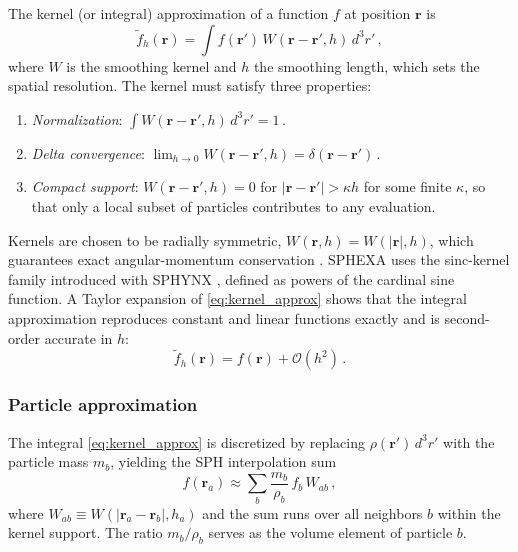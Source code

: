 The kernel (or integral) approximation of a function $f$ at position $\mathbf{r}$ is \cite{Rosswog2009}
\begin{equation}
    \tilde{f}_h(\mathbf{r}) = \int f(\mathbf{r}') \, W(\mathbf{r} - \mathbf{r}', h) \, d^3 r'\,,
    \label{eq:kernel_approx}
\end{equation}
where $W$ is the smoothing kernel and $h$ the smoothing length, which sets the spatial resolution. The kernel must satisfy three properties:
\begin{enumerate}
    \item \emph{Normalization}: $\int W(\mathbf{r} - \mathbf{r}', h) \, d^3 r' = 1$\,.
    \item \emph{Delta convergence}: $\lim_{h \to 0} W(\mathbf{r} - \mathbf{r}', h) = \delta(\mathbf{r} - \mathbf{r}')$\,.
    \item \emph{Compact support}: $W(\mathbf{r} - \mathbf{r}', h) = 0$ for $|\mathbf{r} - \mathbf{r}'| > \kappa h$ for some finite $\kappa$, so that only a local subset of particles contributes to any evaluation.
\end{enumerate}
Kernels are chosen to be radially symmetric, $W(\mathbf{r},h) = W(|\mathbf{r}|, h)$, which guarantees exact angular-momentum conservation \cite{Rosswog2009}. SPHEXA uses the sinc-kernel family introduced with SPHYNX \cite{Cabezon2017}, defined as powers of the cardinal sine function. A Taylor expansion of \eqref{eq:kernel_approx} shows that the integral approximation reproduces constant and linear functions exactly and is second-order accurate in $h$:
\begin{equation}
    \tilde{f}_h(\mathbf{r}) = f(\mathbf{r}) + \mathcal{O}(h^2)\,.
    \label{eq:kernel_accuracy}
\end{equation}


\subsubsection*{Particle approximation}

The integral \eqref{eq:kernel_approx} is discretized by replacing $\rho(\mathbf{r}')\,d^3r'$ with the particle mass $m_b$, yielding the SPH interpolation sum \cite{Rosswog2009}
\begin{equation}
    f(\mathbf{r}_a) \approx \sum_b \frac{m_b}{\rho_b}\, f_b \, W_{ab}\,,
    \label{eq:sph_interp}
\end{equation}
where $W_{ab} \equiv W(|\mathbf{r}_a - \mathbf{r}_b|, h_a)$ and the sum runs over all neighbors $b$ within the kernel support. The ratio $m_b / \rho_b$ serves as the volume element of particle $b$.


